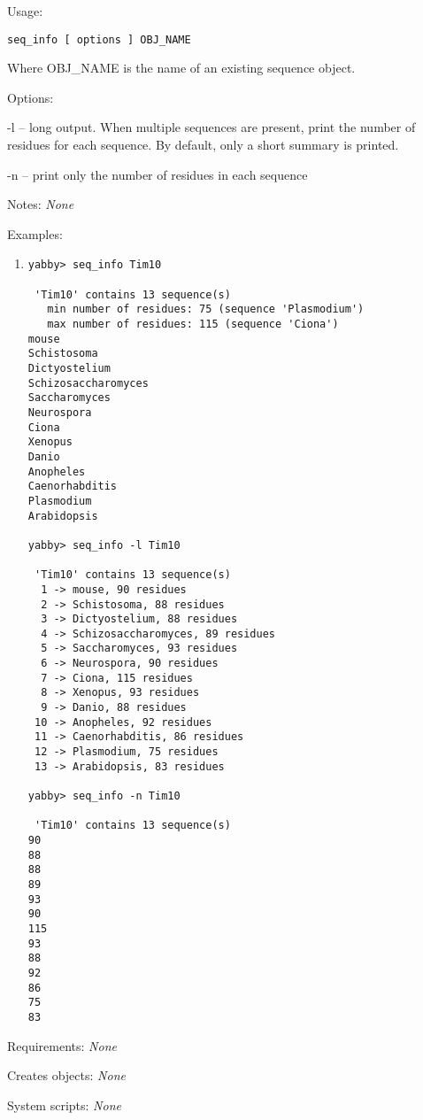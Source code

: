 \begin{description}


\item{Usage:}

{\tt seq\_info [ options ] OBJ\_NAME}

Where OBJ\_NAME is the name of an existing sequence object.


\item{Options:}
\begin{description}
\item -l -- long output.  When multiple sequences are present,
            print the number of residues for each sequence.
            By default, only a short summary is printed.
\item -n -- print only the number of residues in each sequence
\end{description}


\item{Notes:} {\em None}


\item{Examples:}
\begin{enumerate}

\item
\begin{verbatim}
yabby> seq_info Tim10

 'Tim10' contains 13 sequence(s)
   min number of residues: 75 (sequence 'Plasmodium')
   max number of residues: 115 (sequence 'Ciona')
mouse
Schistosoma
Dictyostelium
Schizosaccharomyces
Saccharomyces
Neurospora
Ciona
Xenopus
Danio
Anopheles
Caenorhabditis
Plasmodium
Arabidopsis

yabby> seq_info -l Tim10

 'Tim10' contains 13 sequence(s)
  1 -> mouse, 90 residues
  2 -> Schistosoma, 88 residues
  3 -> Dictyostelium, 88 residues
  4 -> Schizosaccharomyces, 89 residues
  5 -> Saccharomyces, 93 residues
  6 -> Neurospora, 90 residues
  7 -> Ciona, 115 residues
  8 -> Xenopus, 93 residues
  9 -> Danio, 88 residues
 10 -> Anopheles, 92 residues
 11 -> Caenorhabditis, 86 residues
 12 -> Plasmodium, 75 residues
 13 -> Arabidopsis, 83 residues

yabby> seq_info -n Tim10

 'Tim10' contains 13 sequence(s)
90
88
88
89
93
90
115
93
88
92
86
75
83
\end{verbatim}

\end{enumerate}


\item{Requirements:} {\em None}


\item{Creates objects:} {\em None}


\item{System scripts:} {\em None}

\end{description}

